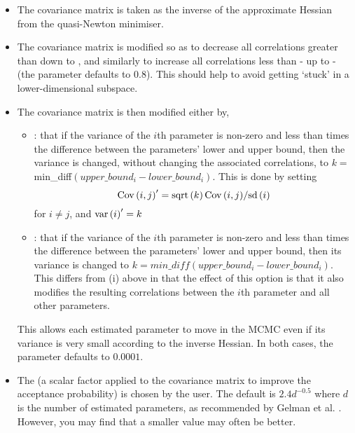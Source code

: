 \begin{itemize}
\item The covariance matrix is taken as the inverse of the approximate Hessian from the quasi-Newton minimiser.
\item The covariance matrix is modified so as to decrease all correlations greater than  down to , and similarly to increase all correlations less than  - up to - (the  parameter defaults to 0.8). This should help to avoid getting `stuck' in a lower-dimensional subspace.

\item The covariance matrix is then modified either by,

\begin{itemize}
\item  {}: that if the variance of the $i$th parameter is non-zero and less than  times the difference between the parameters' lower and upper bound, then the variance is changed, without changing the associated correlations, to $k=$min\_diff$(upper\_bound_i-lower\_bound_i)$. This is done by setting \[
{\mathop{\rm Cov}\nolimits} \left( {i,j} \right)^\prime   = {{{\mathop{\rm sqrt}\nolimits} \left( k \right){\mathop{\rm Cov}\nolimits} \left( {i,j} \right)} \mathord{\left/
{\vphantom {{{\mathop{\rm sqrt}\nolimits} \left( k \right){\mathop{\rm Cov}\nolimits} \left( {i,j} \right)} {{\mathop{\rm sd}\nolimits} \left( i \right)}}} \right.
\kern-\nulldelimiterspace} {{\mathop{\rm sd}\nolimits} \left( i \right)}}
\]
for $i \ne j$, and ${\mathop{\rm var}} \left( i \right)^\prime   = k$


\item  {}: that if the variance of the $i$th parameter is non-zero and less than  times the difference between the parameters' lower and upper bound, then its variance is changed to $k=min\_diff(upper\_bound_i-lower\_bound_i)$. This differs from (i) above in that the effect of this option is that it also modifies the resulting correlations between the $i$th parameter and all other parameters.
\end{itemize}

This allows each estimated parameter to move in the MCMC even if its variance is very small according to the inverse Hessian. In both cases, the  parameter defaults to $0.0001$.

\item The  (a scalar factor applied to the covariance matrix to improve the acceptance probability) is chosen by the user. The default is $2.4d^{-0.5}$ where $d$ is the number of estimated parameters, as recommended by Gelman et al. \citep{823}. However, you may find that a smaller value may often be better. 
\end{itemize}

